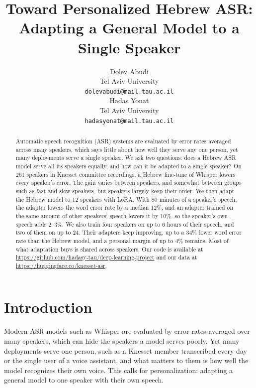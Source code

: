 \documentclass[11pt]{article}
\title{Toward Personalized Hebrew ASR: Adapting a General Model to a Single Speaker}
\author{
  Dolev Abudi \\
  Tel Aviv University \\
  \texttt{dolevabudi@mail.tau.ac.il} \\\And
  Hadas Yonat \\
  Tel Aviv University \\
  \texttt{hadasyonat@mail.tau.ac.il}
}
\begin{document}
\maketitle




\begin{abstract}
Automatic speech recognition (ASR) systems are evaluated by error rates averaged across many speakers, which says little
about how well they serve any one person, yet many deployments serve a single speaker. We ask two questions: does a Hebrew ASR model
serve all its speakers equally, and how can it be adapted to a single speaker?
On 261 speakers in Knesset committee recordings, a Hebrew fine-tune of Whisper
lowers every speaker's error. The gain varies between speakers, and somewhat
between groups such as fast and slow speakers, but speakers largely keep their
order. We then adapt the Hebrew model to 12 speakers with LoRA. With 80 minutes
of a speaker's speech, the adapter lowers the word error rate by a median 12\%,
and an adapter trained on the same amount of other speakers' speech lowers it by
10\%, so the speaker's own speech adds 2--3\%. We also train four speakers on up
to 6 hours of their speech, and two of them on up to 24. Their adapters keep improving, up to a 34\% lower
word error rate than the Hebrew model, and a personal margin of up to 4\%
remains. Most of what adaptation buys is shared across speakers. Our code is
available at \url{https://github.com/hadasy-tau/deep-learning-project} and our
data at \url{https://huggingface.co/knesset-asr}.
\end{abstract}



\section{Introduction}

Modern ASR models such as Whisper \citep{radford2023whisper} are evaluated by
error rates averaged over many speakers, which can hide the speakers a
model serves poorly. Yet many deployments serve one person, such as a
Knesset member transcribed every day or the single user of a voice assistant, and
what matters to them is how well the model recognizes their own voice. This calls
for personalization: adapting a general model to one speaker with their own speech.
\end{document}

